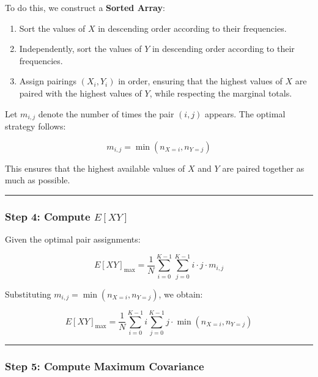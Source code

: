\documentclass[
  12pt,
  letterpaper,
  DIV=11,
  numbers=noendperiod]{scrartcl}
\providecommand{\tightlist}{%
  \setlength{\itemsep}{0pt}\setlength{\parskip}{0pt}}\usepackage{longtable,booktabs,array}
\begin{document}
To do this, we construct a \textbf{Sorted Array}:

\begin{enumerate}
\def\labelenumi{\arabic{enumi}.}
\tightlist
\item
  Sort the values of \(X\) in descending order according to their
  frequencies.
\item
  Independently, sort the values of \(Y\) in descending order according
  to their frequencies.
\item
  Assign pairings \((X_i, Y_i)\) in order, ensuring that the highest
  values of \(X\) are paired with the highest values of \(Y\), while
  respecting the marginal totals.
\end{enumerate}

Let \(m_{i,j}\) denote the number of times the pair \((i,j)\) appears.
The optimal strategy follows:

\[m_{i,j} = \min(n_{X=i}, n_{Y=j})\]

This ensures that the highest available values of \(X\) and \(Y\) are
paired together as much as possible.

\begin{center}\rule{0.5\linewidth}{0.5pt}\end{center}

\subsubsection{\texorpdfstring{\textbf{Step 4: Compute
\(E[XY]\)}}{Step 4: Compute E{[}XY{]}}}\label{step-4-compute-exy}

Given the optimal pair assignments:

\[E[XY]_{\max} = \frac{1}{N} \sum_{i=0}^{K-1} \sum_{j=0}^{K-1} i \cdot j \cdot m_{i,j}\]

Substituting \(m_{i,j} = \min(n_{X=i}, n_{Y=j})\), we obtain:

\[E[XY]_{\max} = \frac{1}{N} \sum_{i=0}^{K-1} i \sum_{j=0}^{K-1} j \cdot \min(n_{X=i}, n_{Y=j})\]

\begin{center}\rule{0.5\linewidth}{0.5pt}\end{center}

\subsubsection{\texorpdfstring{\textbf{Step 5: Compute Maximum
Covariance}}{Step 5: Compute Maximum Covariance}}\label{step-5-compute-maximum-covariance}
\end{document}
